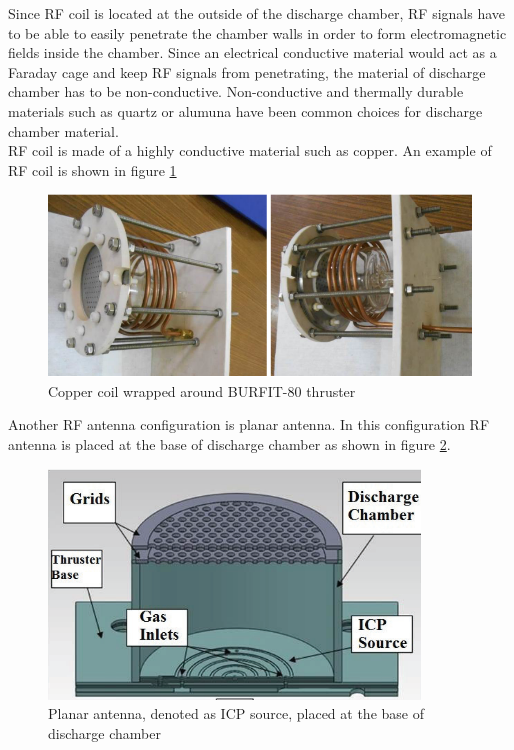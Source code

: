 Since RF coil is located at the outside of the discharge chamber, RF signals have to be able to easily penetrate the chamber walls in order to form electromagnetic fields inside the chamber. Since an electrical conductive material would act as a Faraday cage and keep RF signals from penetrating, the material of discharge chamber has to be non-conductive. Non-conductive and thermally durable materials such as quartz or alumuna have been common choices for discharge chamber material\cite{goebel2008fundamentals}. \\
RF coil is made of a highly conductive material such as copper. An example of RF coil is shown in figure \ref{fig:coppercoil}

\begin{figure}[ht]
    \centering
    \includegraphics[scale=.75]{fig/burfitcoil.png}
    \caption[Copper coil wrapped around BURFIT-80 thruster]{Copper coil wrapped around BURFIT-80 thruster\cite{kokal2017design}}
    \label{fig:coppercoil}
\end{figure}
\newpage

Another RF antenna configuration is planar antenna. In this configuration RF antenna is placed at the base of discharge chamber as shown in figure \ref{fig:planarantenna}.
\begin{figure}[ht]
    \centering
    \includegraphics{fig/planarantenna.png}
    \caption[Planar antenna, denoted as ICP source, placed at the base of discharge chamber]{Planar antenna, denoted as ICP source, placed at the base of discharge chamber\cite{Bumbarger}}
\label{fig:planarantenna}
\end{figure}

